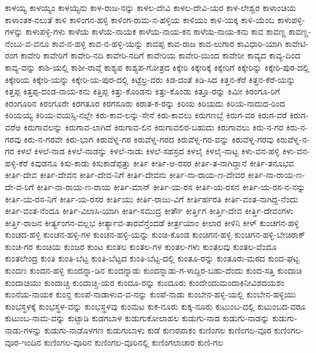 {ಕಾಳಯ್ಯ
ಕಾಳಯ್ಯಂ
ಕಾಳಯ್ಯನು
ಕಾಳ-ರಾಜ-ನನ್ನು
ಕಾಳಲ-ದೇವಿ
ಕಾಳಲ-ದೇವಿ-ಯರ
ಕಾಳ-ಲೇಶ್ವರ
ಕಾಳಾಂಚಿಯ
ಕಾಳಾಂತಕ-ನಲುತೆ
ಕಾಳಿ
ಕಾಳಿಂಗನ-ಹಳ್ಳಿ
ಕಾಳಿಂಗ-ರಾಮ-ನ-ಹಳ್ಳಿಯ
ಕಾಳಿಯಂ
ಕಾಳಿ-ಯಕ್ಕ
ಕಾಳಿ-ಯೆಂಬ
ಕಾಳುಪಳ್ಳಿ-ಗಳನ್ನು
ಕಾಳುಪಳ್ಳಿ-ಗಳು
ಕಾಳೆಯ
ಕಾಳೆಯ-ನಾಯಕ
ಕಾಳೆಯ-ನಾಯ-ಕನ
ಕಾಳೆಯ-ನಾಯ-ಕನು
ಕಾವ
ಕಾವಣ್ಣ
ಕಾವಣ್ಣ-ನೆಂಬು-ವ-ವನೂ
ಕಾವ-ನ-ಹಳ್ಳಿ
ಕಾವ-ನ-ಹಳ್ಳಿ-ಯನ್ನು
ಕಾವಪ್ಪ
ಕಾವ-ರಾಜ
ಕಾವ-ಲುಗಾರ
ಕಾವಿಧಾರಿ-ಯಾಗಿ
ಕಾವೇಟಿ-ರಂಗ
ಕಾವೇರಿ
ಕಾವೇರಿಗೆ
ಕಾವೇರಿ-ನದಿ
ಕಾವೇರಿ-ನದಿಗೆ
ಕಾವೇರಿಯ
ಕಾವೇರಿ-ಯಿಂದ
ಕಾವೇರೀ
ಕಾವ್ಯದ
ಕಾವ್ಯ-ದಿಂದ
ಕಾವ್ಯ-ವನ್ನು
ಕಾಶಿ-ಯಲ್ಲಿ
ಕಾಶೀ-ರಾವ್ಗೆ
ಕಾಶ್ಯಪ
ಕಾಶ್ಯಪ-ಗೋತ್ರದ
ಕಿಕ್ಕೇರಿ
ಕಿಕ್ಕೇರಿಕ್ಕೆ
ಕಿಕ್ಕೇರಿಗೆ
ಕಿಕ್ಕೇರಿನ್ನು
ಕಿಕ್ಕೇರಿ-ಪುರ-ದಲ್ಲಿ
ಕಿಕ್ಕೇರಿಯ
ಕಿಕ್ಕೇರಿ-ಯನ್ನು
ಕಿಕ್ಕೇರಿ-ಯ-ಪುರ-ದಲ್ಲಿ
ಕಿಟ್ಟೆಲ್ರ-ವರು
ಕಿಡ-ದಂತೆ
ಕಿಡಿ-ಸಿದ
ಕಿತ್ತನ-ಕೆರೆ
ಕಿತ್ತನ-ಕೆರೆ-ಯನ್ನು
ಕಿತ್ತಪ್ಪ
ಕಿತ್ತಪ್ಪ-ದಂಡ-ನಾಯ-ಕನು
ಕಿತ್ತಿಪ್ಪ
ಕಿತ್ತು-ಕೊಂಡನು
ಕಿತ್ತು-ಕೊಂಡು
ಕಿತ್ತೂ-ರನ್ನು
ಕಿಮೀ
ಕಿರಂಗೂ-ರಿಗೆ
ಕಿರಂಗೂರಿನ
ಕಿರಂಗೂರೇ
ಕಿರಗತೂರ
ಕಿರಗಸೂರು
ಕಿರಾತ-ಕ-ರನ್ನು
ಕಿರಿಯ
ಕಿರಿಯದು
ಕಿರಿಯ-ನಾದುದ-ರಿಂದ
ಕಿರಿಯಯ್ಯ
ಕಿರಿಯ-ವಯಸ್ಸಿ-ನಲ್ಲೇ
ಕಿರು-ಕಾವ-ಲನ್ನು-ಸೇನೆ
ಕಿರು-ಕಾವಲು
ಕಿರುಗಣಬ್ಬೆ
ಕಿರುಗ-ವರ
ಕಿರುಗ-ವರೆ
ಕಿರುಗ-ವರೆಅ
ಕಿರುಗಾವಲನ್ನು
ಕಿರುಗಾವ-ಲಾಗಿದೆ
ಕಿರುಗಾವ-ಲಿನ
ಕಿರುಗಾವಲಿರ-ಬಹುದು
ಕಿರುಗಾವಲು
ಕಿರು-ನ-ಗರ
ಕಿರು-ನ-ಗರವು
ಕಿರು-ನ-ಗರವೇ
ಕಿರು-ಭಾಗ
ಕಿರುವೆಳ್ನ-ಗರ
ಕಿರುವೆಳ್ನ-ಗರದ
ಕಿರುವೆಳ್ನ-ಗರ-ವನ್ನು
ಕಿರುವೆಳ್ನ-ಗರವು
ಕಿರುವೆಳ್ನ-ನ-ಗರ
ಕಿಳಲೆ
ಕಿಳಲೆ-ನಾಡ
ಕಿಳಲೆ-ನಾಡನ್ನು
ಕಿಳಲೆ-ನಾಡು
ಕಿಳಲೆ-ಸಹಸ್ರದ
ಕಿಳಲೈ
ಕಿಳಲೈ-ನಾಟ್ಟ
ಕಿಳು-ವನ-ಹಳ್ಳಿ
ಕಿಳು-ವನ-ಹಳ್ಳಿ-ಕೆರೆ
ಕಿವುಡನೂ
ಕಿಸು-ಕಾಡು
ಕಿಸುಕಾಡೆಪ್ಪತ್ತು
ಕೀರ್ತಿ
ಕೀರ್ತಿ-ಅ-ರಸರ
ಕೀರ್ತಿ-ತ-ನಾಗಿದ್ದಾನೆ
ಕೀರ್ತಿ-ತನೂಭವ
ಕೀರ್ತಿ-ದೇವ
ಕೀರ್ತಿ-ದೇವನ
ಕೀರ್ತಿ-ದೇವ-ನಿಗೆ
ಕೀರ್ತಿ-ದೇವನು
ಕೀರ್ತಿ-ನಾ-ರಾಯ-ಣ-ದೇವರ
ಕೀರ್ತಿ-ನಾ-ರಾಯ-ಣ-ದೇ-ವ-ರಿಗೆ
ಕೀರ್ತಿ-ನಾ-ರಾಯ-ಣ-ರಾಯ
ಕೀರ್ತಿ-ಮಾನ್
ಕೀರ್ತಿ-ಯ-ರಸ
ಕೀರ್ತಿ-ಯ-ರಸನ
ಕೀರ್ತಿ-ಯ-ರಸ-ನ-ನನ್ನು
ಕೀರ್ತಿ-ಯ-ರಸ-ನಿಗೆ
ಕೀರ್ತಿ-ಯ-ರಸರ
ಕೀರ್ತಿಯು
ಕೀರ್ತಿ-ರಾಜು-ವಿಗೆ
ಕೀರ್ತಿರ್ಹರತಿ
ಕೀರ್ತಿ-ವಂತ-ನಾಗಿದ್ದ-ನೆಂದು
ಕೀರ್ತಿ-ವಂತ-ನೆಂದೂ
ಕೀರ್ತಿ-ವಿಲಾಸಿ-ಯಾಗಿ
ಕೀರ್ತಿ-ಸಮುದ್ರ
ಕೀರ್ತೌ
ಕೀರ್ತ್ತಿಗ
ಕೀರ್ತ್ತಿ-ದೇವ
ಕೀರ್ತ್ತಿ-ದೇವಂಗಳು
ಕೀರ್ತ್ತಿ-ರಾಜನ
ಕೀರ್ತ್ಯಂಗನ-ವಲ್ಲಭ
ಕೀರ್ತ್ಯಾವ-ತಾರವೆನ್ತೆಂದಡೆ
ಕೀರ್ತ್ರಯಾಂ
ಕೀಲಾರ
ಕೀಳಿನಿ
ಕೀಳ್
ಕುಂಚಗನ-ಹಳ್ಳಿ
ಕುಂಚದ-ಹಳ್ಳಿ
ಕುಂಚನ-ಹಳ್ಳಿ-ಗಳ
ಕುಂಚನ-ಹಳ್ಳಿ-ಯನ್ನು
ಕುಂಚಿ-ಕೊಂಡ
ಕುಂಚಿಗನ-ಹಳ್ಳಿ
ಕುಂಚಿಗನ-ಹಳ್ಳಿ-ಬೇಚಿರಾಕ್
ಕುಂಚಿ-ಗರ
ಕುಂಚಿಯ
ಕುಂಜರ
ಕುಂಟ
ಕುಂತಲ
ಕುಂತಲ-ಗಳ
ಕುಂತಲ-ಗಳು
ಕುಂತಲವು
ಕುಂತಲ-ವೆಂದೂ
ಕುಂತಲೇಂದ್ರ
ಕುಂತಿ
ಕುಂತಿ-ಬೆಟ್ಟ
ಕುಂತಿ-ಬೆಟ್ಟದ
ಕುಂತಿ-ಬೆಟ್ಟ-ದಲ್ಲಿ
ಕುಂತೂ-ರನ್ನು
ಕುಂತೂರು-ಮಠದ
ಕುಂದ-ಘಟ್ಟ
ಕುಂದಣ
ಕುಂದನ-ಹಳ್ಳಿ
ಕುಂದನ್ನಾ-ಡಿನ
ಕುಂದನ್ನಾಡು
ಕುಂದನ್ನಾಡು-ಗ-ಳಾದ್ದಿರ-ಬಹು-ದೆಂದು
ಕುಂದ-ಸತ್ತಿ
ಕುಂದಾಚಿ
ಕುಂದಾಚಿಯು
ಕುಂದಾಚ್ಚಿ
ಕುಂದಾಚ್ಚಿ-ಯರ
ಕುಂದೂ-ರನ್ನು
ಕುಂದೂರು
ಕುಂದೇಂದುಮಂದಾಕಿನೀವಿಶದಯಶಂ
ಕುಂನೆಯ-ನಾಯಕ
ಕುಂನ್ದ
ಕುಂಪೆ-ನಾಡಾಳುವ-ವ-ನನ್ನು
ಕುಂಪೆ-ನಾಡು
ಕುಂಬೇನ-ಹಳ್ಳಿ-ಯಲ್ಲಿ
ಕುಂಬೇನ-ಹಳ್ಳಿಯು
ಕುಂಭಸ್ಥಳಕ್ಕೆ
ಕುಂಭಸ್ಥಳ-ವನ್ನು
ಕುಂಭಸ್ಥಳವು
ಕುಂಮಟ
ಕುಕ-ನೂರು
ಕುಕ್ಕ-ನೂರು
ಕುಟುಂಬ-ದಲ್ಲಿ
ಕುಟುಂಬದ-ವರೂ
ಕುಟುಂಬ-ನಾಮ-ವನ್ನು
ಕುಟ್ಟಾಡಿ
ಕುಡಗಬಾಳ
ಕುಡುಗುಕೋಲಾಹಲ
ಕುಡುಗು-ನಾಡ
ಕುಡುಗು-ನಾಡನ್ನು
ಕುಡುಗು-ನಾಡು-ಗಳನ್ನು
ಕುಡುಗು-ನಾಡೊಳಗಣ
ಕುಡುಗುಬಾಳು
ಕುಡೆ
ಕುಣರಪಾಕಂ
ಕುಣಿಂಗಲ
ಕುಣಿಂಗಲ-ವೂರ
ಕುಣಿಂಗಲ-ವೂರ-ಇಂದಿನ
ಕುಣಿಂಗಲ-ವೂರಿನ
ಕುಣಿಂಗಲ-ವೂರಿನಲ್ಲಿ
ಕುಣಿಂಗಲಾಚಾರ
ಕುಣಿ-ಗಲ
}
